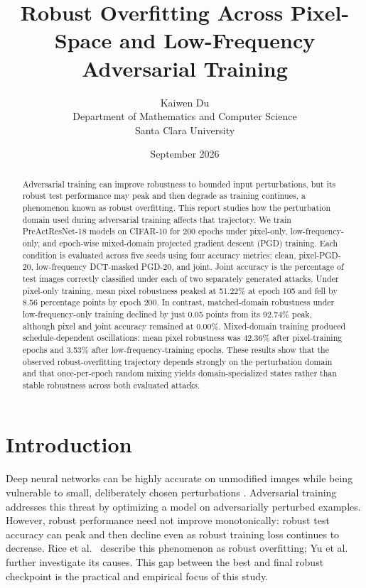 \documentclass[11pt]{article}
\title{Robust Overfitting Across Pixel-Space and Low-Frequency Adversarial Training}
\author{Kaiwen Du\\
  \normalsize Department of Mathematics and Computer Science\\
  \normalsize Santa Clara University}
\date{September 2026}
\begin{document}
\maketitle

\begin{abstract}
Adversarial training can improve robustness to bounded input perturbations, but
its robust test performance may peak and then degrade as training continues, a
phenomenon known as robust overfitting. This report studies how the perturbation
domain used during adversarial training affects that trajectory. We train
PreActResNet-18 models on CIFAR-10 for 200 epochs under pixel-only,
low-frequency-only, and epoch-wise mixed-domain projected gradient descent
(PGD) training. Each condition is evaluated across five seeds using four accuracy metrics:
clean, pixel-PGD-20, low-frequency DCT-masked PGD-20, and joint. Joint accuracy
is the percentage of test images correctly classified under each of two
separately generated attacks. Under pixel-only training, mean pixel robustness peaked at 51.22\%
at epoch 105 and fell by 8.56 percentage points by epoch 200. In contrast,
matched-domain robustness under low-frequency-only training declined by just
0.05 points from its 92.74\% peak, although pixel and joint accuracy
remained at 0.00\%. Mixed-domain training produced schedule-dependent
oscillations: mean pixel robustness was 42.36\% after pixel-training epochs
and 3.53\% after low-frequency-training epochs. These results show that the
observed robust-overfitting trajectory depends strongly on the perturbation
domain and that once-per-epoch random mixing yields domain-specialized states
rather than stable robustness across both evaluated attacks.
\end{abstract}

\section{Introduction}
\label{sec:introduction}

Deep neural networks can be highly accurate on unmodified images while being
vulnerable to small, deliberately chosen perturbations
\cite{goodfellow2015,rice2020}. Adversarial training addresses this threat by
optimizing a model on adversarially perturbed examples. However, robust
performance need not improve monotonically: robust test accuracy can peak and
then decline even as robust training loss continues to decrease. Rice
et al.~\cite{rice2020} describe this phenomenon as robust overfitting; Yu
et al.~\cite{yu2022} further investigate its causes. This gap between the best and
final robust checkpoint is the practical and empirical focus of this study.
\end{document}
